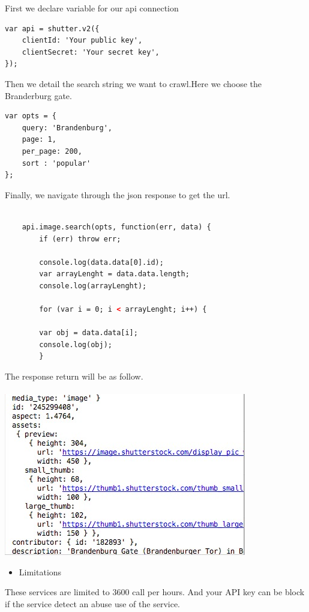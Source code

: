 First we declare variable for our api connection
\begin{lstlisting}[language=XML, basicstyle=\scriptsize]
var api = shutter.v2({
    clientId: 'Your public key',
    clientSecret: 'Your secret key',
});
\end{lstlisting}
Then we detail the search string we want to crawl.Here we choose the Branderburg gate.
\begin{lstlisting}[language=XML, basicstyle=\scriptsize]
var opts = {
    query: 'Brandenburg',
    page: 1,
    per_page: 200,
    sort : 'popular'
};
\end{lstlisting}
Finally, we navigate through the json response to get the url.
\begin{lstlisting}[language=XML, basicstyle=\scriptsize]

    api.image.search(opts, function(err, data) {
        if (err) throw err;

        console.log(data.data[0].id);
        var arrayLenght = data.data.length;
        console.log(arrayLenght);

        for (var i = 0; i < arrayLenght; i++) {

        var obj = data.data[i];
        console.log(obj);
        }
\end{lstlisting}
The response return will be as follow.\\
\\
\includegraphics{jsonShutter}
\begin{itemize}
    \item {Limitations}
\end{itemize}
These services are limited to 3600 call per hours. And your API key can be block if the service detect an abuse use of the service.
